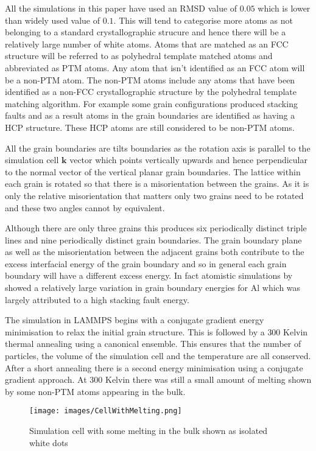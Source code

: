 \documentclass[12pt,a4paper]{book}
\begin{document}
All the simulations in this paper have used an RMSD value of $0.05$ which is lower than widely used value of $0.1$. This will tend to categorise more atoms as not belonging to a standard crystallographic strucure and hence there will be a relatively large number of white atoms. Atoms that are matched as an FCC structure will be referred to as polyhedral template matched atoms and abbreviated as PTM atoms. Any atom that isn't identified as an FCC atom will be a non-PTM atom. The non-PTM atoms include any atoms that have been identified as a non-FCC crystallographic structure by the polyhedral template matching algorithm. For example some grain configurations produced stacking faults and as a result atoms in the grain boundaries are identified as having a HCP structure. These HCP atoms are still considered to be non-PTM atoms.
 
All the grain boundaries are tilts boundaries as the rotation axis is parallel to the simulation cell $\mathbf{k}$ vector which points vertically upwards and hence perpendicular to the normal vector of the vertical planar grain boundaries. The lattice within each grain is rotated so that there is a misorientation between the grains. As it is only the relative misorientation that matters only two grains need to be rotated and these two angles cannot by equivalent.

Although there are only three grains this produces six periodically distinct triple lines and nine periodically distinct grain boundaries. The grain boundary plane as well as the misorientation between the adjacent grains both contribute to the excess interfacial energy of the grain boundary and so in general each grain boundary will have a different excess energy. In fact atomistic simulations by \cite{HOLM2010905} showed a relatively large variation in grain boundary energies for Al which was largely attributed to a high stacking fault energy. 

The simulation in LAMMPS begins with a conjugate gradient energy minimisation to relax the initial grain structure. This is followed by a $300$ Kelvin thermal annealing using a canonical ensemble. This ensures that the number of particles, the volume of the simulation cell and the temperature are all conserved. After a short annealing there is a second energy minimisation using a conjugate gradient approach. At $300$ Kelvin there was still a small amount of melting shown by some non-PTM atoms appearing in the bulk. 

\begin{figure}[H]
	\centering
	\texttt{[image: images/CellWithMelting.png]} 
	\label{fig:CellMelt}
	\caption{Simulation cell with some melting in the bulk shown
	as isolated white dots}
\end{figure}
\end{document}
